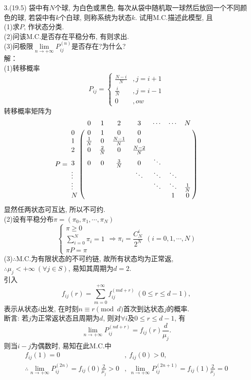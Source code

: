3.(19.5) 袋中有$N$个球, 为白色或黑色, 每次从袋中随机取一球然后放回一个不同颜色的球, 若袋中有$k$个白球, 则称系统为状态$k$. 试用M.C.描述此模型, 且\\
(1)求$P$, 作状态分类.\\
(2)问该M.C.是否存在平稳分布, 有则求出.\\
(3)问极限$\lim\limits_{n\rightarrow +\infty}P^{(n)}_{ij}$是否存在?为什么?\\
解：\\
(1)转移概率
\[
P_{ij}=
\begin{cases}
\frac{N-i}{N}&, j = i + 1\\
\frac{i}{N}&, j = i - 1\\
0&,	ow
\end{cases}
\]
转移概率矩阵为
\[
P =
\bordermatrix{
	~ & 0 & 1 & 2 & 3 & \cdots & \cdots & N \cr
	0 & 0 & 1 & 0 & 0 & ~  & ~  & ~ \cr
	1 & \frac{1}{N} & 0 & \frac{N-1}{N} & 0 & ~  & ~ & ~ \cr
	2 & 0 & \frac{2}{N} & 0 & \frac{N-2}{N} & ~  & ~ & ~ \cr
	3 & 0 & 0 & \frac{3}{N} & 0 & \ddots & ~ & ~ \cr
	\vdots & ~  & ~  & ~  & \ddots & \ddots& \ddots & ~ \cr
	\vdots & ~ & ~ & ~ & ~ & \ddots& \ddots & \frac{1}{N} \cr
	N & ~ & ~ & ~ & ~ & ~ & 1 & 0 \cr
}
\]
显然任两状态可互达, 所以不可约.\\
(2)设有平稳分布$\pi = (\pi_0, \pi_1, \cdots, \pi_N)$\\
\[
\begin{cases}
\pi \geqslant 0\\
\sum\limits^N_{i=0}\pi_i = 1\\
\pi P = \pi
\end{cases}
\Rightarrow
\pi_i = \frac{C^i_N}{2^N}~~(i = 0,1,\cdots,N)
\]
(3)$\therefore$M.C.为有限状态的不可约链, 故所有状态均为正常返,\\
$\therefore \mu_j < +\infty~(\forall j \in S)$, 易知其周期为$d = 2$.\\
引入
\[
f_{ij}(r) = \sum^{+\infty}_{m=0}f^{(md+r)}_{ij}~(0 \leqslant r \leqslant d-1),
\]
表示从状态$i$出发, 在时刻$n\equiv r\pmod d$首次到达状态$j$的概率.\\
断言: 若$j$为正常返状态且周期为$d$, 则对$\forall i\text{及}0 \leqslant r \leqslant d-1$, 有
\[
\lim_{n\rightarrow +\infty}P^{(nd+r)}_{ij} = f_{ij}(r)\frac{d}{\mu_j}.
\]
则当$i-j$为偶数时, 易知在此M.C.中
\[
\begin{split}
f_{ij}(1) = 0 &, ~f_{ij}(0) > 0,\\
\therefore \lim_{n\rightarrow +\infty}P^{(2n)}_{ij} = f_{ij}(0)\frac{2}{\mu_j} > 0 &, ~ \lim_{n\rightarrow +\infty}P^{(2n+1)}_{ij} = f_{ij}(1)\frac{2}{\mu_j} = 0
\end{split}
\]
